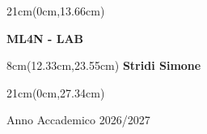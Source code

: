 \begin{titlepage}
\begin{textblock*}{21cm}(0cm,13.66cm)
	\fontsize{20}{24}\selectfont
	\centerline  {\textbf{ML4N - LAB}}
\end{textblock*}


\fontsize{14}{17}\selectfont

\begin{textblock*}{8cm}(12.33cm,23.55cm)
	\noindent	\textbf{Stridi Simone}
\end{textblock*}


\begin{textblock*}{21cm}(0cm,27.34cm)
	\centerline{Anno Accademico 2026/2027}
\end{textblock*}

\end{titlepage}